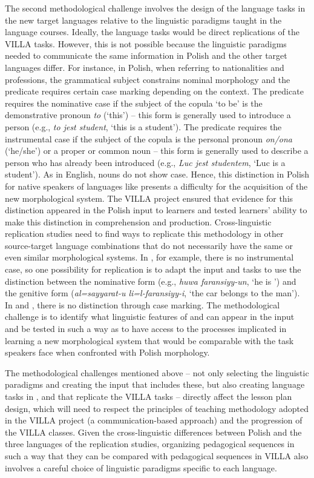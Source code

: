 \documentclass[output=paper,colorlinks,citecolor=brown,modfonts,nonflat]{../langscibook}
\begin{document}
The second methodological challenge involves the design of the language tasks in the new target languages relative to the linguistic paradigms taught in the language courses. Ideally, the language tasks would be direct replications of the VILLA tasks. However, this is not possible because the linguistic paradigms needed to communicate the same information in Polish and the other target languages differ. For instance, in Polish, when referring to nationalities and professions, the grammatical subject constrains nominal morphology and the predicate requires certain case marking depending on the context. The predicate requires the nominative case if the subject of the copula ‘to be’ is the demonstrative pronoun \textit{to} (‘this’) – this form is generally used to introduce a person (e.g., \textit{to jest student}, ‘this is a student’). The predicate requires the instrumental case if the subject of the copula is the personal pronoun \textit{on/ona} (‘he/she’) or a proper or common noun – this form is generally used to describe a person who has already been introduced (e.g., \textit{Luc jest studentem}, ‘Luc is a student'). As in English,  nouns do not show case. Hence, this distinction in Polish for native speakers of languages like  presents a difficulty for the acquisition of the new morphological system. The VILLA project ensured that evidence for this distinction appeared in the Polish input to learners and tested learners’ ability to make this distinction in comprehension and production. Cross-linguistic replication studies need to find ways to replicate this methodology in other source-target language combinations that do not necessarily have the same or even similar morphological systems. In , for example, there is no instrumental case, so one possibility for replication is to adapt the input and tasks to use the distinction between the nominative form (e.g., \textit{huwa faransiyy-un}, ‘he is ’) and the genitive form (\textit{al=sayyarat-u li=l-faransiyy-i}, ‘the car belongs to the  man’). In  and , there is no distinction through case marking. The methodological challenge is to identify what linguistic features of  and  can appear in the input and be tested in such a way as to have access to the processes implicated in learning a new morphological system that would be comparable with the task  speakers face when confronted with Polish morphology.

The methodological challenges mentioned above – not only selecting the linguistic paradigms and creating the input that includes these, but also creating language tasks in ,  and  that replicate the VILLA tasks – directly affect the lesson plan design, which will need to respect the principles of teaching methodology adopted in the VILLA project (a communication-based approach) and the progression of the VILLA classes. Given the cross-linguistic differences between Polish and the three languages of the replication studies, organizing pedagogical sequences in such a way that they can be compared with pedagogical sequences in VILLA also involves a careful choice of linguistic paradigms specific to each language.
\end{document}
